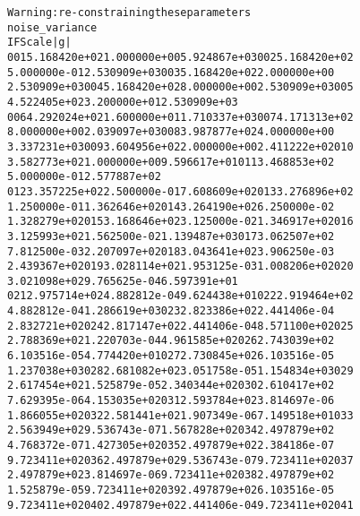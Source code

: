 \documentclass[letterpaper,10pt,english]{/usr/share/sphinx/texinputs/sphinxhowto}
\newenvironment{InvisibleVerbatim}
        {\begin{mdframed}[leftmargin=0.1\linewidth,innerleftmargin=3pt,innerrightmargin=3pt, userdefinedwidth=1\linewidth, linewidth=0pt, linecolor=white, usetwoside=false]}
        {\end{mdframed}}
\begin{document}
    

        
        

            
                \begin{InvisibleVerbatim}
                \vspace{-0.5\baselineskip}
\begin{alltt}Warning: re-constraining these parameters
noise\_variance
 I     F              Scale          |g|
 001   5.168420e+02   1.000000e+00   5.924867e+03  002   5.168420e+02
5.000000e-01   2.530909e+03  003   5.168420e+02   2.000000e+00
2.530909e+03  004   5.168420e+02   8.000000e+00   2.530909e+03  005
4.522405e+02   3.200000e+01   2.530909e+03
 006   4.292024e+02   1.600000e+01   1.710337e+03  007   4.171313e+02
8.000000e+00   2.039097e+03  008   3.987877e+02   4.000000e+00
3.337231e+03  009   3.604956e+02   2.000000e+00   2.411222e+02  010
3.582773e+02   1.000000e+00   9.596617e+01  011   3.468853e+02
5.000000e-01   2.577887e+02
 012   3.357225e+02   2.500000e-01   7.608609e+02  013   3.276896e+02
1.250000e-01   1.362646e+02  014   3.264190e+02   6.250000e-02
1.328279e+02  015   3.168646e+02   3.125000e-02   1.346917e+02  016
3.125993e+02   1.562500e-02   1.139487e+03  017   3.062507e+02
7.812500e-03   2.207097e+02  018   3.043641e+02   3.906250e-03
2.439367e+02  019   3.028114e+02   1.953125e-03   1.008206e+02  020
3.021098e+02   9.765625e-04   6.597391e+01
 021   2.975714e+02   4.882812e-04   9.624438e+01  022   2.919464e+02
4.882812e-04   1.286619e+03  023   2.823386e+02   2.441406e-04
2.832721e+02  024   2.817147e+02   2.441406e-04   8.571100e+02  025
2.788369e+02   1.220703e-04   4.961585e+02  026   2.743039e+02
6.103516e-05   4.774420e+01  027   2.730845e+02   6.103516e-05
1.237038e+03  028   2.681082e+02   3.051758e-05   1.154834e+03  029
2.617454e+02   1.525879e-05   2.340344e+02  030   2.610417e+02
7.629395e-06   4.153035e+02  031   2.593784e+02   3.814697e-06
1.866055e+02  032   2.581441e+02   1.907349e-06   7.149518e+01  033
2.563949e+02   9.536743e-07   1.567828e+02  034   2.497879e+02
4.768372e-07   1.427305e+02  035   2.497879e+02   2.384186e-07
9.723411e+02  036   2.497879e+02   9.536743e-07   9.723411e+02  037
2.497879e+02   3.814697e-06   9.723411e+02  038   2.497879e+02
1.525879e-05   9.723411e+02  039   2.497879e+02   6.103516e-05
9.723411e+02  040   2.497879e+02   2.441406e-04   9.723411e+02  041

\end{alltt}
\end{InvisibleVerbatim}
\end{document}
